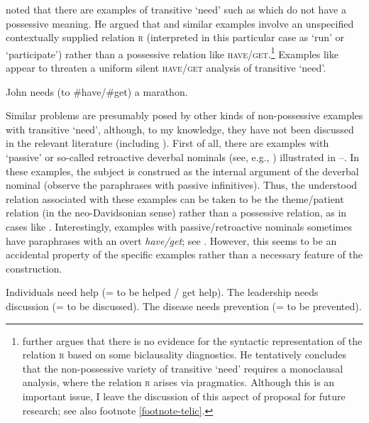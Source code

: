 \documentclass[output=paper,colorlinks,citecolor=brown]{langscibook}
\begin{document}
\citet{Schwarz2006} noted that there are examples of transitive `need' such as  which do not have a possessive meaning. He argued that  and similar examples involve an unspecified contextually supplied relation \textsc{r} (interpreted in this particular case as `run' or `participate') rather than a possessive relation like \textsc{have/get}.\footnote{\citet{Schwarz2006} further argues that there is no evidence for the syntactic representation of the relation \textsc{r} based on some biclausality diagnostics. He tentatively concludes that the non-possessive variety of transitive `need' requires a monoclausal analysis, where the relation \textsc{r} arises via pragmatics. Although this is an important issue, I leave the discussion of this aspect of  proposal for future research; see also footnote \ref{footnote-telic}.\label{footnote-pragmatic}} Examples like  appear to threaten a uniform silent \textsc{have/get} analysis of transitive `need'.

\ea John needs (to \#have/\#get) a marathon.\hfill \citep[272]{Schwarz2006} \label{marathon}
\z

\noindent Similar problems are presumably posed by other kinds of non-possessive examples with transitive `need', although, to my knowledge, they have not been discussed in the relevant literature (including \citealt{Schwarz2006}). First of all, there are examples with `passive' or so-called retroactive deverbal nominals (see, e.g., \citealt{Safir1991,Roeper2000}) illustrated in --. In these examples, the subject is construed as the internal argument of the deverbal nominal (observe the paraphrases with passive infinitives). Thus, the understood relation associated with these examples can be taken to be the theme/patient relation (in the neo-Davidsonian sense) rather than a possessive relation, as in cases like . Interestingly, examples with passive/retroactive nominals sometimes have paraphrases with an overt \textit{have/get}; see . However, this seems to be an accidental property of the specific examples rather than a necessary feature of the construction.

\ea\label{retroactive}
\ea Individuals need help (= to be helped / get help).\label{need-help}
\ex The leadership needs discussion (= to be discussed).
\ex The disease needs prevention (= to be prevented).\label{need-prevention} \hfill \citep[306]{Roeper2000}
\z \z
\end{document}
